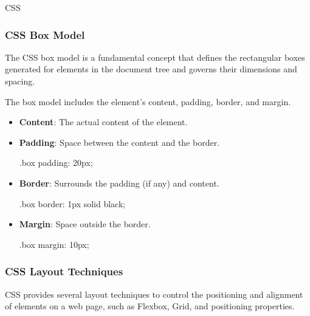 \begin{notes}{CSS}
\begin{highlight}
    \end{highlight}
    
    \subsubsection*{CSS Box Model}
    
    The CSS box model is a fundamental concept that defines the rectangular boxes generated for elements in the document tree and governs their dimensions and spacing.
    
    \begin{highlight}
    
        The box model includes the element’s content, padding, border, and margin.
        
        \begin{itemize}
            \item \textbf{Content}: The actual content of the element.
            \item \textbf{Padding}: Space between the content and the border.
    \begin{code}[CSS]
    .box {
        padding: 20px;
    }
    \end{code}
            \item \textbf{Border}: Surrounds the padding (if any) and content.
    \begin{code}[CSS]
    .box {
        border: 1px solid black;
    }
    \end{code}
            \item \textbf{Margin}: Space outside the border.
    \begin{code}[CSS]
    .box {
        margin: 10px;
    }
    \end{code}
        \end{itemize}
    
    \end{highlight}
    
    \subsubsection*{CSS Layout Techniques}
    
    CSS provides several layout techniques to control the positioning and alignment of elements on a web page, such as Flexbox, Grid, and positioning properties.
    
    \begin{highlight}
    

\end{highlight}
\end{notes}
